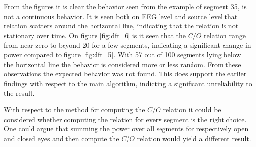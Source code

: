 \noindent
From the figures it is clear the behavior seen from the example of segment 35, is not a continuous behavior. 
It is seen both on EEG level and source level that relation scatters around the horizontal line, indicating that the relation is not stationary over time.  
On figure \ref{fig:dft_6} is it seen that the $C/O$ relation range from near zero to beyond 20 for a few segments, indicating a significant change in power compared to figure \ref{fig:dft_5}. 
With 57 out of 100 segments lying below the horizontal line the behavior is considered more or less random. 
From these observations the expected behavior was not found. 
This does support the earlier findings with respect to the main algorithm, indicting a significant unreliability to the result. 

With respect to the method for computing the $C/O$ relation it could be considered whether computing the relation for every segment is the right choice. 
One could argue that summing the power over all segments for respectively open and closed eyes and then compute the $C/O$ relation would yield a different result.  